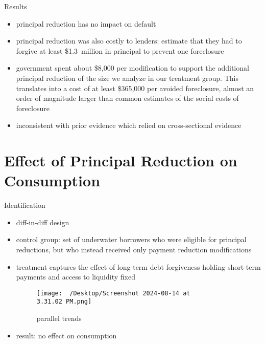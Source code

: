 \begin{frame}{Results}
\begin{itemize}
        \item principal reduction has no impact on default
        \item principal reduction was also costly to lenders: estimate that they had to forgive at least \$1.3 million in principal to prevent one foreclosure
        \item government spent about \$8,000 per modification to support the additional principal reduction of the size we analyze in our treatment group. This translates into a cost of at least \$365,000 per avoided foreclosure, almost an order of magnitude larger than common estimates of the social costs of foreclosure
        \item inconsistent with prior evidence which relied on cross-sectional evidence
\end{itemize}
\end{frame}

\section{Effect of Principal Reduction on Consumption}

\begin{frame}{Identification}
    \begin{itemize}
        \item diff-in-diff design
        \item control group: set of underwater borrowers who were eligible for principal reductions, but who instead received only payment reduction modifications
        \item treatment captures the effect of long-term debt forgiveness holding short-term payments and access to liquidity fixed
        \begin{figure}
            \centering
            \texttt{[image: ~/Desktop/Screenshot 2024-08-14 at 3.31.02 PM.png]}
            \caption{parallel trends}
            \label{fig:photo}
        \end{figure}
        \item result: no effect on consumption
    \end{itemize}
\end{frame}


